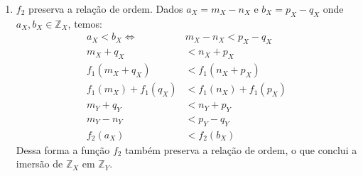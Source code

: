 \documentclass[../main.tex]{subfiles}
\begin{document}
\begin{dem}
\begin{enumerate}
\begin{enumerate}
            \item $f_2$ preserva a relação de ordem. Dados $a_X = m_X - n_X$ e $b_X = p_X - q_X$ onde $a_X, b_X \in \mathbb{Z}_X$, temos:
            \begin{align*}
                a_X < b_X \iff& m_X - n_X < p_X - q_X \\
                m_X + q_X &< n_X + p_X \\
                f_1(m_X+q_X) &< f_1(n_X+p_X) \\
                f_1(m_X) + f_1(q_X) &< f_1(n_X) + f_1(p_X) \\
                m_Y + q_Y &< n_Y + p_Y \\
                m_Y - n_Y &< p_Y - q_Y \\
                f_2(a_X) &< f_2(b_X)
            \end{align*}
            Dessa forma a função $f_2$ também preserva a relação de ordem, o que conclui a imersão de $\mathbb{Z}_X$ em $\mathbb{Z}_Y$.
        \end{enumerate}
    
    

\end{enumerate}
\end{dem}
\end{document}
